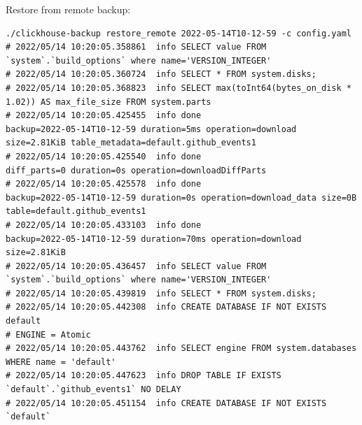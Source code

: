 Restore from remote backup:
\begin{verbatim}
./clickhouse-backup restore_remote 2022-05-14T10-12-59 -c config.yaml
# 2022/05/14 10:20:05.358861  info SELECT value FROM `system`.`build_options` where name='VERSION_INTEGER'
# 2022/05/14 10:20:05.360724  info SELECT * FROM system.disks;
# 2022/05/14 10:20:05.368823  info SELECT max(toInt64(bytes_on_disk * 1.02)) AS max_file_size FROM system.parts
# 2022/05/14 10:20:05.425455  info done                      backup=2022-05-14T10-12-59 duration=5ms operation=download size=2.81KiB table_metadata=default.github_events1
# 2022/05/14 10:20:05.425540  info done                      diff_parts=0 duration=0s operation=downloadDiffParts
# 2022/05/14 10:20:05.425578  info done                      backup=2022-05-14T10-12-59 duration=0s operation=download_data size=0B table=default.github_events1
# 2022/05/14 10:20:05.433103  info done                      backup=2022-05-14T10-12-59 duration=70ms operation=download size=2.81KiB
# 2022/05/14 10:20:05.436457  info SELECT value FROM `system`.`build_options` where name='VERSION_INTEGER'
# 2022/05/14 10:20:05.439819  info SELECT * FROM system.disks;
# 2022/05/14 10:20:05.442308  info CREATE DATABASE IF NOT EXISTS default
# ENGINE = Atomic
# 2022/05/14 10:20:05.443762  info SELECT engine FROM system.databases WHERE name = 'default'
# 2022/05/14 10:20:05.447623  info DROP TABLE IF EXISTS `default`.`github_events1` NO DELAY
# 2022/05/14 10:20:05.451154  info CREATE DATABASE IF NOT EXISTS `default`

\end{verbatim}
